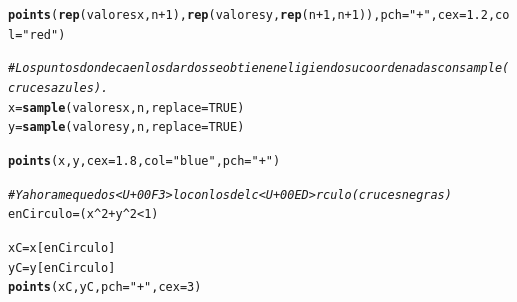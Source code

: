 \documentclass[10pt,a4paper]{article}\usepackage[]{graphicx}\usepackage[]{color}
\makeatletter
\newcommand{\hlnum}[1]{\textcolor[rgb]{0.686,0.059,0.569}{#1}}%
\newcommand{\hlstr}[1]{\textcolor[rgb]{0.192,0.494,0.8}{#1}}%
\newcommand{\hlcom}[1]{\textcolor[rgb]{0.678,0.584,0.686}{\textit{#1}}}%
\newcommand{\hlopt}[1]{\textcolor[rgb]{0,0,0}{#1}}%
\newcommand{\hlstd}[1]{\textcolor[rgb]{0.345,0.345,0.345}{#1}}%
\newcommand{\hlkwb}[1]{\textcolor[rgb]{0.69,0.353,0.396}{#1}}%
\newcommand{\hlkwc}[1]{\textcolor[rgb]{0.333,0.667,0.333}{#1}}%
\newcommand{\hlkwd}[1]{\textcolor[rgb]{0.737,0.353,0.396}{\textbf{#1}}}%
\newenvironment{kframe}{%
 \def\at@end@of@kframe{}%
 \ifinner\ifhmode%
  \def\at@end@of@kframe{\end{minipage}}%
  \begin{minipage}{\columnwidth}%
 \fi\fi%
 \def\FrameCommand##1{\hskip\@totalleftmargin \hskip-\fboxsep
 \colorbox{shadecolor}{##1}\hskip-\fboxsep
     \hskip-\linewidth \hskip-\@totalleftmargin \hskip\columnwidth}%
 \MakeFramed {\advance\hsize-\width
   \@totalleftmargin\z@ \linewidth\hsize
   \@setminipage}}%
 {\par\unskip\endMakeFramed%
 \at@end@of@kframe}
\newenvironment{knitrout}{}{} %
\makeatother
\begin{document}
\begin{enumerate}
\begin{knitrout}
\begin{kframe}
\begin{alltt}
\hlkwd{points}\hlstd{(}\hlkwd{rep}\hlstd{(valoresx,n}\hlopt{+}\hlnum{1}\hlstd{),}\hlkwd{rep}\hlstd{(valoresy,} \hlkwd{rep}\hlstd{(n}\hlopt{+}\hlnum{1}\hlstd{,n}\hlopt{+}\hlnum{1}\hlstd{)),} \hlkwc{pch}\hlstd{=}\hlstr{"+"}\hlstd{,} \hlkwc{cex}\hlstd{=}\hlnum{1.2}\hlstd{,} \hlkwc{col}\hlstd{=}\hlstr{"red"}\hlstd{)}


\hlcom{# Los puntos donde caen los dardos se obtienen eligiendo su coordenadas con sample (cruces azules).}
\hlstd{x} \hlkwb{=} \hlkwd{sample}\hlstd{(valoresx, n,} \hlkwc{replace} \hlstd{=} \hlnum{TRUE}\hlstd{)}
\hlstd{y} \hlkwb{=} \hlkwd{sample}\hlstd{(valoresy, n,} \hlkwc{replace} \hlstd{=} \hlnum{TRUE}\hlstd{)}

\hlkwd{points}\hlstd{(x,y,} \hlkwc{cex}\hlstd{=}\hlnum{1.8}\hlstd{,} \hlkwc{col}\hlstd{=}\hlstr{"blue"}\hlstd{,} \hlkwc{pch}\hlstd{=}\hlstr{"+"}\hlstd{)}

\hlcom{# Y ahora me quedo s<U+00F3>lo con los del c<U+00ED>rculo (cruces negras)}
\hlstd{enCirculo} \hlkwb{=} \hlstd{( x}\hlopt{^}\hlnum{2} \hlopt{+} \hlstd{y}\hlopt{^}\hlnum{2} \hlopt{<} \hlnum{1}\hlstd{)}

\hlstd{xC} \hlkwb{=} \hlstd{x[enCirculo]}
\hlstd{yC} \hlkwb{=} \hlstd{y[enCirculo]}
\hlkwd{points}\hlstd{(xC,yC,} \hlkwc{pch} \hlstd{=} \hlstr{"+"}\hlstd{,} \hlkwc{cex}\hlstd{=}\hlnum{3}\hlstd{)}


\end{alltt}
\end{kframe}
\end{knitrout}
\end{enumerate}
\end{document}
